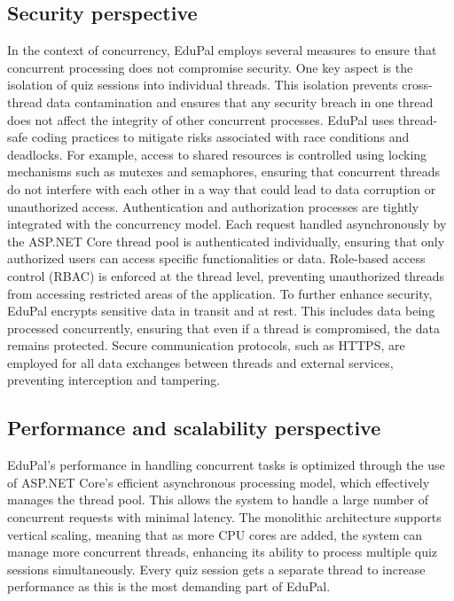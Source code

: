\subsection{Security perspective}

In the context of concurrency, EduPal employs several measures to ensure that concurrent processing does not compromise security. One key aspect is the isolation of quiz sessions into individual threads. This isolation prevents cross-thread data contamination and ensures that any security breach in one thread does not affect the integrity of other concurrent processes.
EduPal uses thread-safe coding practices to mitigate risks associated with race conditions and deadlocks. For example, access to shared resources is controlled using locking mechanisms such as mutexes and semaphores, ensuring that concurrent threads do not interfere with each other in a way that could lead to data corruption or unauthorized access.
Authentication and authorization processes are tightly integrated with the concurrency model. Each request handled asynchronously by the ASP.NET Core thread pool is authenticated individually, ensuring that only authorized users can access specific functionalities or data. Role-based access control (RBAC) is enforced at the thread level, preventing unauthorized threads from accessing restricted areas of the application.
To further enhance security, EduPal encrypts sensitive data in transit and at rest. This includes data being processed concurrently, ensuring that even if a thread is compromised, the data remains protected. Secure communication protocols, such as HTTPS, are employed for all data exchanges between threads and external services, preventing interception and tampering.

\subsection{Performance and scalability perspective}

EduPal's performance in handling concurrent tasks is optimized through the use of ASP.NET Core's efficient asynchronous processing model, which effectively manages the thread pool. This allows the system to handle a large number of concurrent requests with minimal latency. The monolithic architecture supports vertical scaling, meaning that as more CPU cores are added, the system can manage more concurrent threads, enhancing its ability to process multiple quiz sessions simultaneously. Every quiz session gets a separate thread to increase performance as this is the most demanding part of EduPal.

